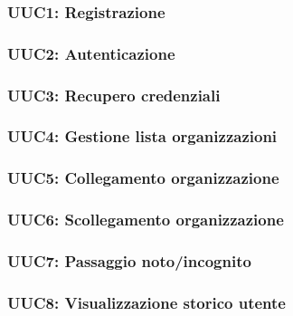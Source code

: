 \documentclass[../analisi-dei-requisiti.tex]{subfiles}
\begin{document}
\subsubsection{UUC1: Registrazione}%
\label{subs:UUC1}



\subsubsection{UUC2: Autenticazione}%
\label{subs:UUC2}



\subsubsection{UUC3: Recupero credenziali}%
\label{subs:UUC3}



\subsubsection{UUC4: Gestione lista organizzazioni}%
\label{subs:UUC4}



\subsubsection{UUC5: Collegamento organizzazione}%
\label{subs:UUC5}



\subsubsection{UUC6: Scollegamento organizzazione}%
\label{subs:UUC6}



\subsubsection{UUC7: Passaggio noto/incognito}%
\label{subs:UUC7}



\subsubsection{UUC8: Visualizzazione storico utente}%
\label{subs:UUC8}
\end{document}
